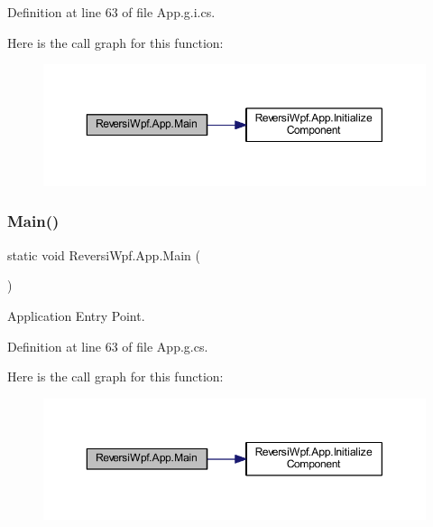 Definition at line 63 of file App.\+g.\+i.\+cs.

Here is the call graph for this function\+:
\nopagebreak
\begin{figure}[H]
\begin{center}
\leavevmode
\includegraphics[width=350pt]{class_reversi_wpf_1_1_app_a21f38c0f40a47a04302edeeb7bf005f8_cgraph}
\end{center}
\end{figure}
\mbox{\label{class_reversi_wpf_1_1_app_a21f38c0f40a47a04302edeeb7bf005f8}} 
\subsubsection{\texorpdfstring{Main()}{Main()}\hspace{0.1cm}{\footnotesize\ttfamily [3/4]}}
{\footnotesize\ttfamily static void Reversi\+Wpf.\+App.\+Main (\begin{DoxyParamCaption}{ }\end{DoxyParamCaption})\hspace{0.3cm}{\ttfamily [static]}}



Application Entry Point. 



Definition at line 63 of file App.\+g.\+cs.

Here is the call graph for this function\+:
\nopagebreak
\begin{figure}[H]
\begin{center}
\leavevmode
\includegraphics[width=350pt]{class_reversi_wpf_1_1_app_a21f38c0f40a47a04302edeeb7bf005f8_cgraph}
\end{center}
\end{figure}
\mbox{\label{class_reversi_wpf_1_1_app_a21f38c0f40a47a04302edeeb7bf005f8}} 
